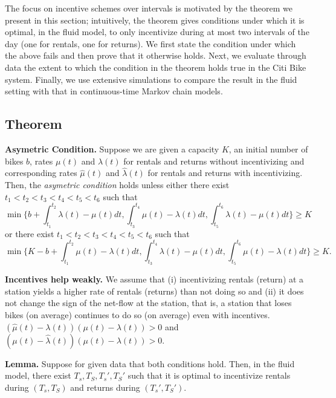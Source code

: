The focus on incentive schemes over intervals is motivated by the theorem we present in this section;  intuitively, the theorem gives conditions under which it is optimal, in the fluid model, to only incentivize during at most two intervals of the day (one for rentals, one for returns). We first state the condition under which the above fails and then prove that it otherwise holds. Next, we evaluate through data the extent to which the condition in the theorem holds true in the Citi Bike system. Finally, we use extensive simulations to compare the result in the fluid setting with that in continuous-time Markov chain models.

\subsection{Theorem} 
\label{ssec:theorem}


\textbf{Asymetric Condition.} Suppose we are given a capacity $K$, an initial number of bikes $b$, rates $\mu(t)$ and $\lambda(t)$ for rentals and returns without incentivizing and corresponding rates $\hat{\mu}(t)$ and $\hat{\lambda}(t)$ for rentals and returns with incentivizing. Then, the \emph{asymetric condition} holds unless either there exist $t_1<t_2<t_3<t_4<t_5<t_6$ such that
\[
\min\{
b+\int_{t_1}^{t_2} \lambda(t)-\mu(t)dt,
\int_{t_3}^{t_4} \mu(t)-\lambda(t)dt,
\int_{t_5}^{t_6} \lambda(t)-\mu(t)dt
\}
\geq K
\]
or there exist $t_1<t_2<t_3<t_4<t_5<t_6$ such that
\[
\min\{
K-b+\int_{t_1}^{t_2} \mu(t)-\lambda(t)dt,
\int_{t_3}^{t_4} \lambda(t)-\mu(t)dt,
\int_{t_5}^{t_6} \mu(t)-\lambda(t)dt
\}
\geq K.
\]

\textbf{Incentives help weakly.} We assume that (i) incentivizing rentals (return) at a station yields a higher rate of rentals (returns) than not doing so and (ii) it does not change the sign of the net-flow at the station, that is, a station that loses bikes (on average) continues to do so (on average) even with incentives.  $(\hat{\mu}(t)-\lambda(t))(\mu(t)-\lambda(t))> 0$ and $(\mu(t)-\hat{\lambda}(t))(\mu(t)-\lambda(t))> 0$.


\textbf{Lemma.}
Suppose for given data that both conditions hold. Then, in the fluid model, there exist $T_s, T_S, T_s',T_S'$ such that it is optimal to incentivize rentals during $(T_s,T_S)$ and returns during $(T_s', T_S')$.

